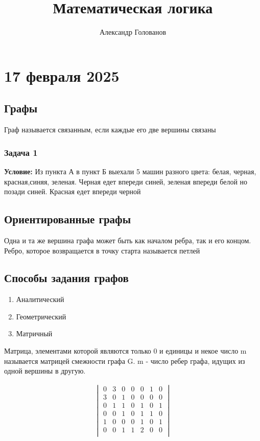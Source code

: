 \documentclass[]{article}
\title{Математическая логика}
\author{Александр Голованов}
\begin{document}
\maketitle
\newpage
\tableofcontents
\newpage

\section{17 февраля 2025}
\subsection{Графы}
Граф называется связанным, если каждые его две вершины связаны

\subsubsection{Задача 1}

\textbf{Условие: }Из пункта А в пункт Б выехали 5 машин разного цвета: белая, черная, красная,синяя, зеленая. Черная едет впереди синей, зеленая впереди белой но позади синей. Красная едет впереди черной

\subsection{Ориентированные графы}

Одна и та же вершина графа может быть как началом ребра, так и его концом. Ребро, которое возвращается в точку старта называется петлей

\subsection{Способы задания графов}
\begin{enumerate}
\item Аналитический
\item Геометрический
\item Матричный
\end{enumerate}

Матрица, элементами которой являются только 0 и единицы и некое число m называется матрицей смежности графа G. m - число ребер графа, идущих из одной вершины в другую.

\begin{gather*}
\begin{vmatrix}
0 & 3 & 0& 0 & 0&1&0\\
3  & 0 & 1 & 0 & 0 &0& 0\\
0 & 1&1&0&1&0&1\\
0&0&1&0&1&1&0\\
1&0&0&0&1&0&1\\
0&0&1&1&2&0&0\\
\end{vmatrix}
\end{gather*}
\end{document}
